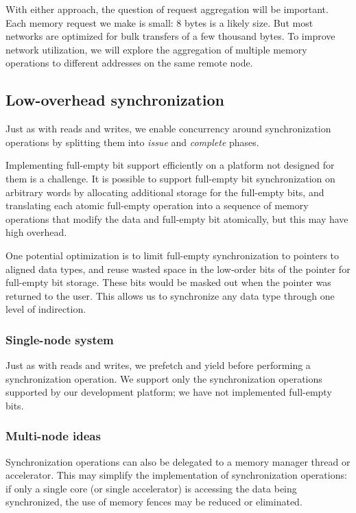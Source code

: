 \documentclass[10pt,nocopyrightspace,preprint]{sigplanconf}
\begin{document}
{With either approach, the question of request aggregation will be
important. Each memory request we make is small: 8 bytes is a likely
size. But most networks are optimized for bulk transfers of a few
thousand bytes. To improve network utilization, we will explore the
aggregation of multiple memory operations to different addresses on
the same remote node. 


\subsection{Low-overhead synchronization}

Just as with reads and writes, we enable concurrency around
synchronization operations by splitting them into {\em issue} and {\em
  complete} phases.

Implementing full-empty bit support efficiently on a platform not
designed for them is a challenge. It is possible to support full-empty
bit synchronization on arbitrary words by allocating additional
storage for the full-empty bits, and translating each atomic
full-empty operation into a sequence of memory operations that modify
the data and full-empty bit atomically, but this may have high
overhead. 

One potential optimization is to limit full-empty synchronization to
pointers to aligned data types, and reuse wasted space in the
low-order bits of the pointer for full-empty bit storage. These bits
would be masked out when the pointer was returned to the user.  This
allows us to synchronize any data type through one level of
indirection.

\subsubsection{Single-node system}
Just as with reads and writes, we prefetch and yield before performing
a synchronization operation. We support only the synchronization
operations supported by our development platform; we have not
implemented full-empty bits.

\subsubsection{Multi-node ideas}

Synchronization operations can also be delegated to a memory manager
thread or accelerator. This may simplify the implementation of
synchronization operations: if only a single core (or single
accelerator) is accessing the data being synchronized, the use of
memory fences may be reduced or eliminated.

}
\end{document}
